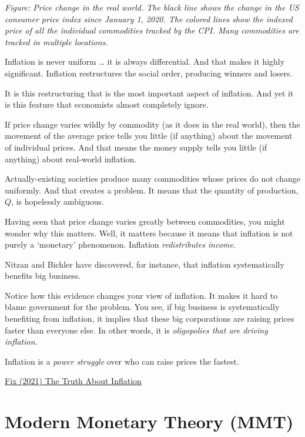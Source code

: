 \documentclass[
]{book}
\begin{document}
\emph{Figure: Price change in the real world. The black line shows the change in the US consumer price index since January 1, 2020. The colored lines show the indexed price of all the individual commodities tracked by the CPI. Many commodities are tracked in multiple locations.}

Inflation is never uniform \ldots{} it is always differential. And that makes it highly significant. Inflation restructures the social order, producing winners and losers.

It is this restructuring that is the most important aspect of inflation.
And yet it is this feature that economists almost completely ignore.

If price change varies wildly by commodity (as it does in the real world), then the movement of the average price tells you little (if anything) about the movement of individual prices. And that means the money supply tells you little (if anything) about real-world inflation.

Actually-existing societies produce many commodities whose prices do not change uniformly. And that creates a problem. It means that the quantity of production, \(Q\), is hopelessly ambiguous.

Having seen that price change varies greatly between commodities, you might wonder why this matters. Well, it matters because it means that inflation is not purely a `monetary' phenomenon. Inflation \emph{redistributes income}.

Nitzan and Bichler have discovered, for instance, that inflation systematically benefits big business.

Notice how this evidence changes your view of inflation. It makes it hard to blame government for the problem. You see, if big business is systematically benefiting from inflation, it implies that these big corporations are raising prices faster than everyone else. In other words, it is \emph{oligopolies that are driving inflation}.

Inflation is a \emph{power struggle} over who can raise prices the fastest.

\href{https://economicsfromthetopdown.com/2021/11/24/the-truth-about-inflation/}{Fix (2021) The Truth About Inflation}

\hypertarget{modern-monetary-theory-mmt}{%
\section{Modern Monetary Theory (MMT)}\label{modern-monetary-theory-mmt}}
\end{document}
